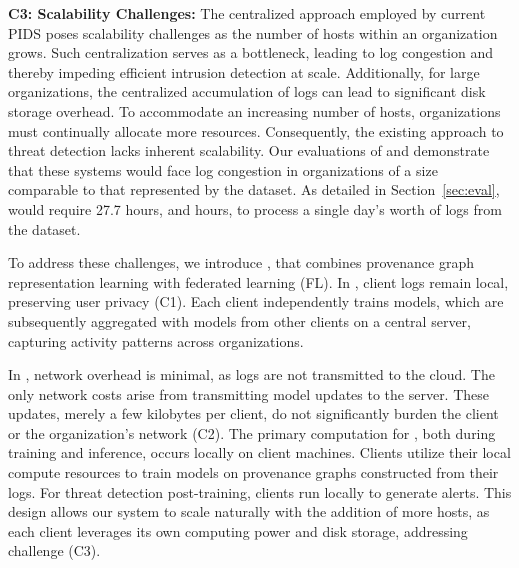 \smallskip
\noindent
\textbf{C3: Scalability Challenges:} The centralized approach employed by current PIDS poses scalability challenges as the number of hosts within an organization grows. Such centralization serves as a bottleneck, leading to log congestion and thereby impeding efficient intrusion detection at scale. Additionally, for large organizations, the centralized accumulation of logs can lead to significant disk storage overhead. To accommodate an increasing number of hosts, organizations must continually allocate more resources. Consequently, the existing approach to threat detection lacks inherent scalability. Our evaluations of \flash and \kairos demonstrate that these systems would face log congestion in organizations of a size comparable to that represented by the \optc dataset. As detailed in Section~\ref{sec:eval}, \flash would require 27.7 hours, and  hours, to process a single day's worth of logs from the \optc dataset.
    



To address these challenges, we introduce \Sys, that combines provenance graph representation learning with federated learning (FL). In \Sys, client logs remain local, preserving user privacy (C1). Each client independently trains \gnnshort models, which are subsequently aggregated with models from other clients on a central server, capturing activity patterns across organizations.

In \Sys, network overhead is minimal, as logs are not transmitted to the cloud. The only network costs arise from transmitting model updates to the server. These updates, merely a few kilobytes per client, do not significantly burden the client or the organization's network (C2). The primary computation for \Sys, both during training and inference, occurs locally on client machines. Clients utilize their local compute resources to train models on provenance graphs constructed from their logs. For threat detection post-training, clients run \Sys locally to generate alerts. This design allows our system to scale naturally with the addition of more hosts, as each client leverages its own computing power and disk storage, addressing challenge (C3).

